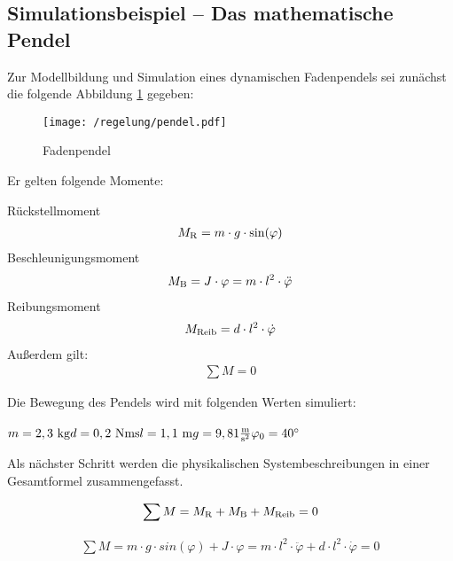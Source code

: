 \subsection{Simulationsbeispiel -- Das mathematische Pendel}

Zur Modellbildung und Simulation eines dynamischen Fadenpendels sei zunächst die folgende Abbildung \ref{fig:pendel} gegeben:

\begin{figure}[h]
	\centering
	\texttt{[image: /regelung/pendel.pdf]}
	\label{fig:pendel}
	\caption{Fadenpendel}
\end{figure}

Er gelten folgende Momente:

Rückstellmoment
\begin{align}
		M_\i{R} = m \cdot g \cdot \si{sin}(\varphi) \label{rueckstellmoment} 
\end{align}
Beschleunigungsmoment
\begin{align}
	M_\i{B} = J \cdot \varphi = m \cdot l^{2} \cdot \ddot\varphi\label{beschleunigungsmoment} 
\end{align}
Reibungsmoment
\begin{align}
	M_\i{Reib} = d \cdot l^{2} \cdot \dot\varphi\label{reibungsmoment} 
\end{align}
Außerdem gilt:
\begin{align}
	\sum M = 0 \label{momentengleichgewicht} 
\end{align}

Die Bewegung des Pendels wird mit folgenden Werten simuliert:\\
\\
$ m = 2,3 ~\i{kg}\\ d = 0,2 ~\i{Nms}\\ l = 1,1 ~\i{m}\\ g = 9,81\tfrac{\i{m}}{\i{s^{2}}} \\ \varphi_\i{0} = 40^{\circ}$

Als nächster Schritt werden die physikalischen Systembeschreibungen in einer Gesamtformel zusammengefasst. 

\begin{align}
	\sum M = M_\i{R} + M_\i{B} + M_\i{Reib} = 0
	\label{momentengleichgewichtgesamt} 
\end{align}

\begin{align}
	\sum M = m \cdot g \cdot \si{sin}(\varphi) + J \cdot \varphi = m \cdot l^{2} \cdot \ddot\varphi + d \cdot l^{2} \cdot \dot\varphi = 0
	\label{momentengleichgewichtgesamt2} 
\end{align}

